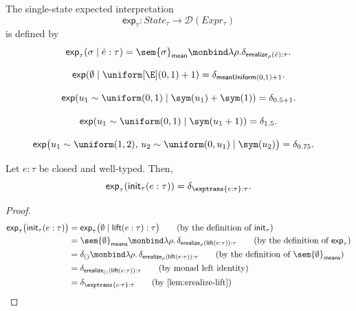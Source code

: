 \begin{definition}
  The single-state expected interpretation
  \[
    \mathsf{exp}_\tau:
    State_\tau\to\mathcal{D}(Expr_\tau)
  \]
  is defined by
  \[
    \mathsf{exp}_\tau
    (\sigma\mid\hat e:\tau)
    =
    \sem{\sigma}_{\mathsf{mean}} \monbind \lambda \rho. \delta_{
      \mathsf{erealize}_{
        \rho
      }(\hat e):\tau
    }.
  \]
\end{definition}

\begin{example}
  \[
    \mathsf{exp}
    (\emptyset\mid\uniform[\E](0,1)+1)
    =
    \delta_{\mathsf{meanUniform}(0,1)+1}.
  \]
\end{example}

\begin{example}
  \[
    \mathsf{exp}
    (u_1\sim\uniform(0,1)\mid\sym(u_1)+\sym(1))
    =
    \delta_{0.5+1}.
  \]
\end{example}

\begin{example}
  \[
    \mathsf{exp}
    (u_1\sim\uniform(0,1)\mid\sym(u_1+1))
    =
    \delta_{1.5}.
  \]
\end{example}

\begin{example}
  \begin{align*}
    \mathsf{exp}
    &\bigl(
      u_1\sim\uniform(1,2),\,
      u_2\sim\uniform(0,u_1)
      \mid\sym(u_2)
    \bigr) = \delta_{0.75}.
  \end{align*}
\end{example}

\begin{lemma}
  Let $e : \tau$ be closed and well-typed. Then,
  \[
    \mathsf{exp}_\tau
    (\mathsf{init}_\tau(e : \tau))
    =
    \delta_{\exptrans{e:\tau} : \tau}.
  \]
\end{lemma}

\begin{proof}
  \begin{align}
    \mathsf{exp}_\tau
    \bigl(\mathsf{init}_\tau(e:\tau)\bigr)
    &=
    \mathsf{exp}_\tau
    \bigl(\emptyset\mid\mathsf{lift}(e:\tau):\tau\bigr)
    \tag{by the definition of $\mathsf{init}_\tau$}
    \\
    &=
    \sem{\emptyset}_{\mathsf{means}}
    \monbind
    \lambda\rho.\,
    \delta_{\mathsf{erealize}_\rho(\mathsf{lift}(e:\tau)):\tau}
    \tag{by the definition of $\mathsf{exp}_\tau$}
    \\
    &=
    \delta_{()}
    \monbind
    \lambda\rho.\,
    \delta_{\mathsf{erealize}_\rho(\mathsf{lift}(e:\tau)):\tau}
    \tag{by the definition of $\sem{\emptyset}_{\mathsf{means}}$}
    \\
    &=
    \delta_{\mathsf{erealize}_{()}(\mathsf{lift}(e:\tau)):\tau}
    \tag{by monad left identity}
    \\
    &=
    \delta_{\exptrans{e:\tau}:\tau}
    \tag{by~\Cref{lem:erealize-lift}}
  \end{align}
\end{proof}

